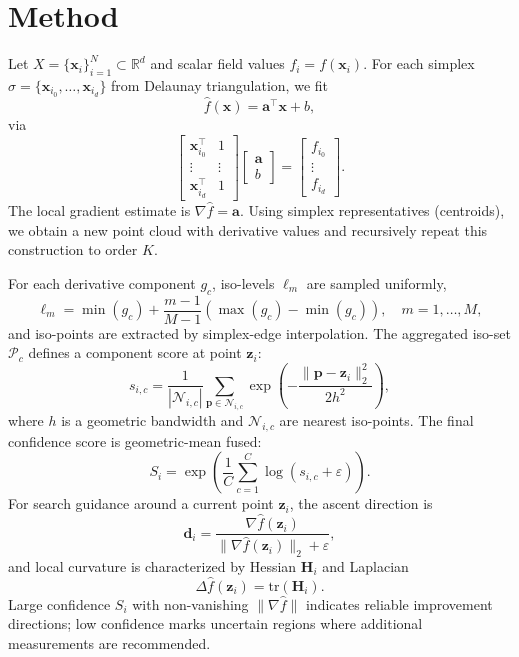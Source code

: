 ﻿\documentclass[conference]{IEEEtran}
\begin{document}
\section{Method}
Let $X = \{\mathbf{x}_i\}_{i=1}^N \subset \mathbb{R}^d$ and scalar field values $f_i = f(\mathbf{x}_i)$. For each simplex $\sigma = \{\mathbf{x}_{i_0},\dots,\mathbf{x}_{i_d}\}$ from Delaunay triangulation, we fit
\begin{equation}
\hat{f}(\mathbf{x}) = \mathbf{a}^\top \mathbf{x} + b,
\end{equation}
via
\begin{equation}
\begin{bmatrix}
\mathbf{x}_{i_0}^\top & 1 \\
\vdots & \vdots \\
\mathbf{x}_{i_d}^\top & 1
\end{bmatrix}
\begin{bmatrix}
\mathbf{a} \\ b
\end{bmatrix}
=
\begin{bmatrix}
f_{i_0} \\
\vdots \\
f_{i_d}
\end{bmatrix}.
\end{equation}
The local gradient estimate is $\nabla \hat{f}=\mathbf{a}$. Using simplex representatives (centroids), we obtain a new point cloud with derivative values and recursively repeat this construction to order $K$.

For each derivative component $g_c$, iso-levels $\ell_m$ are sampled uniformly,
\begin{equation}
\ell_m = \min(g_c) + \frac{m-1}{M-1}\left(\max(g_c)-\min(g_c)\right),\quad m=1,\dots,M,
\end{equation}
and iso-points are extracted by simplex-edge interpolation. The aggregated iso-set $\mathcal{P}_c$ defines a component score at point $\mathbf{z}_i$:
\begin{equation}
s_{i,c} = \frac{1}{|\mathcal{N}_{i,c}|}\sum_{\mathbf{p}\in \mathcal{N}_{i,c}} \exp\!\left(-\frac{\lVert \mathbf{p}-\mathbf{z}_i\rVert_2^2}{2h^2}\right),
\end{equation}
where $h$ is a geometric bandwidth and $\mathcal{N}_{i,c}$ are nearest iso-points. The final confidence score is geometric-mean fused:
\begin{equation}
S_i = \exp\!\left(\frac{1}{C}\sum_{c=1}^C \log(s_{i,c}+\varepsilon)\right).
\end{equation}
For search guidance around a current point $\mathbf{z}_i$, the ascent direction is
\begin{equation}
\mathbf{d}_i = \frac{\nabla \hat{f}(\mathbf{z}_i)}{\lVert\nabla \hat{f}(\mathbf{z}_i)\rVert_2 + \varepsilon},
\end{equation}
and local curvature is characterized by Hessian $\mathbf{H}_i$ and Laplacian
\begin{equation}
\Delta \hat{f}(\mathbf{z}_i) = \mathrm{tr}(\mathbf{H}_i).
\end{equation}
Large confidence $S_i$ with non-vanishing $\lVert\nabla \hat{f}\rVert$ indicates reliable improvement directions; low confidence marks uncertain regions where additional measurements are recommended.
\end{document}
